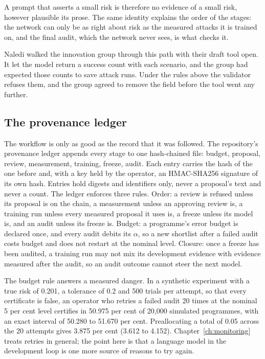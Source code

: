 A prompt that asserts a small risk is therefore no evidence of a small risk, however
plausible its prose. The same identity explains the order of the stages: the network
can only be as right about risk as the measured attacks it is trained on, and the
final audit, which the network never sees, is what checks it.

Naledi walked the innovation group through this path with their draft tool open. It let
the model return a success count with each scenario, and the group had expected those
counts to save attack runs. Under the rules above the validator refuses them, and the
group agreed to remove the field before the tool went any further.

\subsection{The provenance ledger}

The workflow is only as good as the record that it was followed. The repository's
provenance ledger appends every stage to one hash-chained file:
budget, proposal, review, measurement, training, freeze, audit. Each entry carries the
hash of the one before and, with a key held by the operator, an HMAC-SHA256 signature
of its own hash. Entries hold digests and identifiers only, never a proposal's text
and never a count. The ledger enforces three rules. Order: a review is refused unless
its proposal is on the chain, a measurement unless an approving review is, a training
run unless every measured proposal it uses is, a freeze unless its model is, and an
audit unless its freeze is. Budget: a programme's error budget is declared once, and
every audit debits its $\alpha$, so a new shortlist after a failed audit costs budget
and does not restart at the nominal level. Closure: once a freeze has been audited, a
training run may not mix its development evidence with evidence measured after the
audit, so an audit outcome cannot steer the next model.

The budget rule answers a measured danger. In a synthetic experiment with a true risk
of 0.201, a tolerance of 0.2 and 500 trials per attempt, so that every certificate is
false, an operator who retries a failed audit 20 times at the nominal 5 per cent level
certifies in 50.975 per cent of 20{,}000 simulated programmes, with an exact interval of
50.280 to 51.670 per cent. Preallocating a total of 0.05 across the 20 attempts gives
3.875 per cent (3.612 to 4.152).
Chapter~\ref{ch:monitoring} treats retries in general; the point here is that a
language model in the development loop is one more source of reasons to try again.

